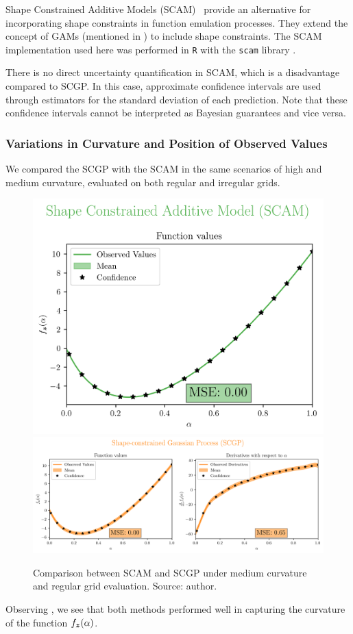 Shape Constrained Additive Models (SCAM)~\cite{Pya2014} provide an alternative for incorporating shape constraints in function emulation processes. They extend the concept of GAMs (mentioned in ) to include shape constraints. The SCAM implementation used here was performed in \texttt{R} with the \texttt{scam} library \cite{scam2012}.

There is no direct uncertainty quantification in SCAM, which is a disadvantage compared to SCGP. In this case, approximate confidence intervals are used through estimators for the standard deviation of each prediction. Note that these confidence intervals cannot be interpreted as Bayesian guarantees and vice versa.

\subsubsection{Variations in Curvature and Position of Observed Values}

We compared the SCGP with the SCAM in the same scenarios of high and medium curvature, evaluated on both regular and irregular grids.

\begin{figure}[H]
    \centering
    \includegraphics[width=.33\textwidth]{../experiments/uniform_new_MC/SCAM_20_nobs.png}
    \includegraphics[width=.66\textwidth]{../experiments/uniform_new_MC/SCGP_20_nobs.png}
    \caption{ {\small Comparison between SCAM and SCGP under medium curvature and regular grid evaluation. Source: author.}}
    \label{fig:SCAMuniformMC}
\end{figure}

Observing , we see that both methods performed well in capturing the curvature of the function \( f_{\boldsymbol{z}}(\alpha) \).

